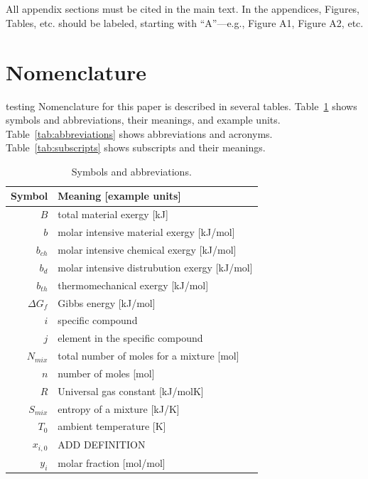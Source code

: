 \documentclass[energies,article,submit,pdftex,moreauthors]{Definitions/mdpi}
\begin{document}
\section[\appendixname~\thesection]{}
All appendix sections must be cited in the main text. In the appendices, Figures, Tables, etc. should be labeled, starting with ``A''---e.g., Figure A1, Figure A2, etc.


\section[\appendixname~\thesection]{Nomenclature}
\label{sec:nomenclature}

testing
Nomenclature for this paper is described in several tables.
Table~\ref{tab:symbols} shows symbols and abbreviations, their meanings, and example units.
Table~\ref{tab:abbreviations} shows abbreviations and acronyms.
Table~\ref{tab:subscripts} shows subscripts and their meanings.




\begin{table}
\footnotesize
\centering %
\caption{Symbols and abbreviations.}
\begin{tabular}{r l}
\toprule
\textbf{Symbol}              & \textbf{Meaning [example units]} \\
\midrule
$B$                 & total material exergy [kJ] \\
$b$                 & molar intensive material exergy [kJ/mol] \\
$b_{ch}$            & molar intensive chemical exergy [kJ/mol] \\
$b_d$               & molar intensive distrubution exergy [kJ/mol] \\
$b_{th}$            & thermomechanical exergy [kJ/mol] \\
$\Delta{G_{f}}$     & Gibbs energy [kJ/mol] \\
$i$                 & specific compound \\
$j$                 & element in the specific compound \\
$N_{mix}$           & total number of moles for a mixture [mol] \\
$n$                 & number of moles [mol] \\
$R$                 & Universal gas constant [kJ/molK] \\
$S_{mix}$           & entropy of a mixture [kJ/K] \\
$T_{0}$             & ambient temperature [K] \\
$x_{i,0}$           & ADD DEFINITION \\
$y_i$               & molar fraction [mol/mol] \\

\bottomrule
\end{tabular}
\label{tab:symbols}
\end{table}
\end{document}
